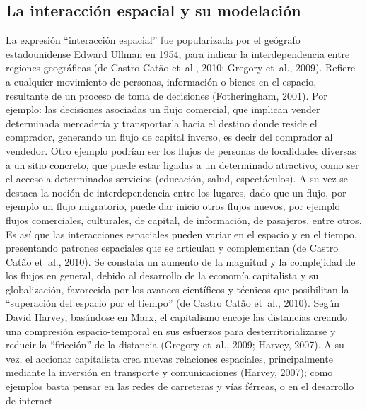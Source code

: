 \documentclass[12pt,spanish,]{article}
\begin{document}
\hypertarget{la-interacciuxf3n-espacial-y-su-modelaciuxf3n}{%
\subsection{La interacción espacial y su
modelación}\label{la-interacciuxf3n-espacial-y-su-modelaciuxf3n}}

La expresión ``interacción espacial'' fue popularizada por el geógrafo
estadounidense Edward Ullman en 1954, para indicar la interdependencia
entre regiones geográficas (de Castro Catão et~al., 2010; Gregory
et~al., 2009). Refiere a cualquier movimiento de personas, información o
bienes en el espacio, resultante de un proceso de toma de decisiones
(Fotheringham, 2001). Por ejemplo: las decisiones asociadas un flujo
comercial, que implican vender determinada mercadería y transportarla
hacia el destino donde reside el comprador, generando un flujo de
capital inverso, es decir del comprador al vendedor. Otro ejemplo
podrían ser los flujos de personas de localidades diversas a un sitio
concreto, que puede estar ligadas a un determinado atractivo, como ser
el acceso a determinados servicios (educación, salud, espectáculos). A
su vez se destaca la noción de interdependencia entre los lugares, dado
que un flujo, por ejemplo un flujo migratorio, puede dar inicio otros
flujos nuevos, por ejemplo flujos comerciales, culturales, de capital,
de información, de pasajeros, entre otros. Es así que las interacciones
espaciales pueden variar en el espacio y en el tiempo, presentando
patrones espaciales que se articulan y complementan (de Castro Catão
et~al., 2010). Se constata un aumento de la magnitud y la complejidad de
los flujos en general, debido al desarrollo de la economía capitalista y
su globalización, favorecida por los avances científicos y técnicos que
posibilitan la ``superación del espacio por el tiempo'' (de Castro Catão
et~al., 2010). Según David Harvey, basándose en Marx, el capitalismo
encoje las distancias creando una compresión espacio-temporal en sus
esfuerzos para desterritorializarse y reducir la ``fricción'' de la
distancia (Gregory et~al., 2009; Harvey, 2007). A su vez, el accionar
capitalista crea nuevas relaciones espaciales, principalmente mediante
la inversión en transporte y comunicaciones (Harvey, 2007); como
ejemplos basta pensar en las redes de carreteras y vías férreas, o en el
desarrollo de internet.
\end{document}
